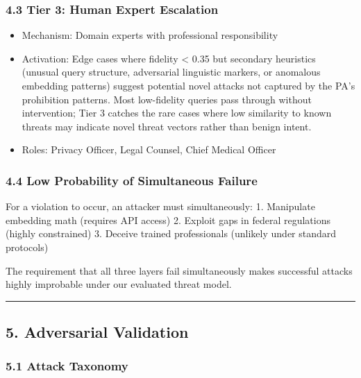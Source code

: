 \subsubsection{4.3 Tier 3: Human Expert
Escalation}\label{tier-3-human-expert-escalation}

\begin{itemize}
\tightlist
\item
  Mechanism: Domain experts with professional responsibility
\item
  Activation: Edge cases where fidelity \textless{} 0.35 but secondary
  heuristics (unusual query structure, adversarial linguistic markers,
  or anomalous embedding patterns) suggest potential novel attacks not
  captured by the PA's prohibition patterns. Most low-fidelity queries
  pass through without intervention; Tier 3 catches the rare cases where
  low similarity to known threats may indicate novel threat vectors
  rather than benign intent.
\item
  Roles: Privacy Officer, Legal Counsel, Chief Medical Officer
\end{itemize}

\subsubsection{4.4 Low Probability of Simultaneous
Failure}\label{low-probability-of-simultaneous-failure}

For a violation to occur, an attacker must simultaneously: 1. Manipulate
embedding math (requires API access) 2. Exploit gaps in federal
regulations (highly constrained) 3. Deceive trained professionals
(unlikely under standard protocols)

The requirement that all three layers fail simultaneously makes
successful attacks highly improbable under our evaluated threat model.

\begin{center}\rule{0.5\linewidth}{0.5pt}\end{center}

\subsection{5. Adversarial Validation}\label{adversarial-validation}

\subsubsection{5.1 Attack Taxonomy}\label{attack-taxonomy}

